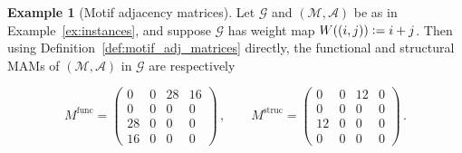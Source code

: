 \documentclass[12pt,draft]{ociamthesis}
\theoremstyle{plain}
\theoremstyle{definition}
\newtheorem{example}{Example}[chapter]
\theoremstyle{remark}
\newcommand\ca[1]{\mathcal{#1}}
\begin{document}
\begin{example}[Motif adjacency matrices]
  \label{ex:motif_adj_matrices}
  Let $\ca{G}$ and $\ca{(M,A)}$ be as in Example~\ref{ex:instances}, and
  suppose $\ca{G}$ has weight map $W((i,j)) \vcentcolon = i + j$. Then using
  Definition~\ref{def:motif_adj_matrices} directly, the functional and
  structural MAMs of $\ca{(M,A)}$ in $\ca{G}$ are respectively

  \vspace*{0.2cm}
  $$ %
  M^\mathrm{func} =
  \begin{pmatrix}
    0  & 0  & 28 & 16 \\
    0  & 0  & 0  & 0  \\
    28 & 0  & 0  & 0  \\
    16 & 0  & 0  & 0
  \end{pmatrix} \,,
  \qquad
  M^\mathrm{struc} =
  \begin{pmatrix}
    0  & 0  & 12 & 0  \\
    0  & 0  & 0  & 0  \\
    12 & 0  & 0  & 0  \\
    0  & 0  & 0  & 0
  \end{pmatrix}\,.
  $$
\end{example}

\pagebreak
\end{document}
